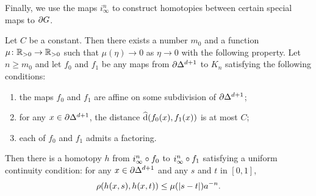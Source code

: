 \documentclass[a4paper]{article}
\begin{document}
Finally, we use the maps $i^n_\infty$ to construct homotopies between certain
special maps to $\partial G$.

\begin{proposition}\label{prop:basic_homotopies}
  Let $C$ be a constant. Then there exists a number $m_0$ and a function $\mu
  \colon \mathbb{R}_{>0}\to\mathbb{R}_{>0}$ such that $\mu(\eta)\to0$ as $\eta\to0$ with the following
  property. Let $n \geq m_0$ and let $f_0$ and $f_1$ be any maps from
  $\partial\Delta^{d+1}$ to $K_n$ satisfying the following conditions:
  \begin{enumerate}
    \item the maps $f_0$ and $f_1$ are affine on some subdivision of
      $\partial\Delta^{d+1}$;
    \item for any $x \in \partial\Delta^{d+1}$, the distance 
      $\operatorname{\widehat{d}}(f_0(x), f_1(x))$ is at most $C$;
    \item each of $f_0$ and $f_1$ admits a factoring.
  \end{enumerate}
  Then there is a homotopy $h$ from $i^n_\infty\circ f_0$ to
  $i^n_\infty\circ f_1$ satisfying a uniform continuity condition: for any
  $x \in \partial\Delta^{d+1}$ and any $s$ and $t$ in $[0,1]$,
  \begin{align*}
    \rho(h(x,s), h(x,t)) \leq \mu(\left|s-t\right|)a^{-n}.
  \end{align*}
\end{proposition}
\end{document}

